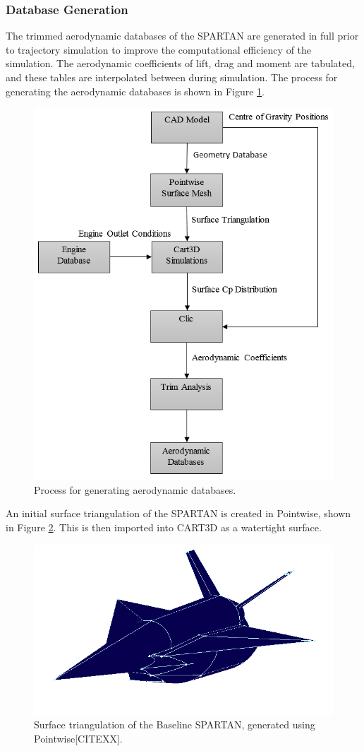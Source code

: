 		
		
		
		
		
		\subsubsection{Database Generation}\label{sec:database}
		The trimmed aerodynamic databases of the SPARTAN are generated in full prior to trajectory simulation to improve the computational efficiency of the simulation. The aerodynamic coefficients of lift, drag and moment are tabulated, and these tables are interpolated between during simulation. 
The process for generating the aerodynamic databases is shown in Figure \ref{fig:FlowChart}. 
				\begin{figure}[ht]
					\centering
					\includegraphics[width=0.7\linewidth]{figures/3_vehicle_design/FlowChart}
					\caption{Process for generating aerodynamic databases.}
					\label{fig:FlowChart}
				\end{figure}
		An initial surface triangulation of the SPARTAN is created in Pointwise, shown in Figure \ref{fig:Pointwise}. This is then imported into CART3D as a watertight surface. 
				\begin{figure}[ht]
					\centering
					\includegraphics[width=0.6\linewidth]{figures/3_vehicle_design/Pointwise}
					\caption{Surface triangulation of the Baseline SPARTAN, generated using Pointwise[CITEXX].}
					\label{fig:Pointwise}
				\end{figure}

